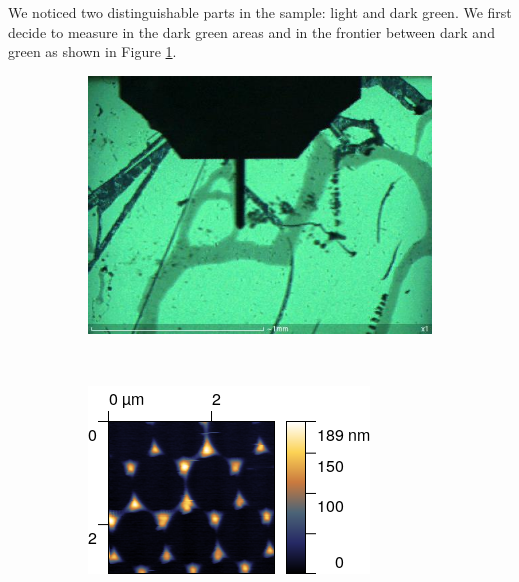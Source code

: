 \documentclass[11pt,a4paper]{article}
\begin{document}
We noticed two distinguishable parts in the sample: light and dark green. We first decide to measure in the dark green areas and in the frontier between dark and green as shown in Figure \ref{fig:sample_3_static}.

\begin{figure}[H]
\centering
\begin{subfigure}[b]{0.4\textwidth}
\includegraphics[width=\textwidth]{sm_sample2_set.JPG}
\caption{}
\label{fig:sample_3_static}
\end{subfigure}\\
\begin{subfigure}[b]{0.45\textwidth}
\includegraphics[width=\textwidth]{sm_sample2}
\caption{}
\end{subfigure}
\begin{subfigure}[b]{0.45\textwidth}

\end{subfigure}
\end{figure}
\end{document}
